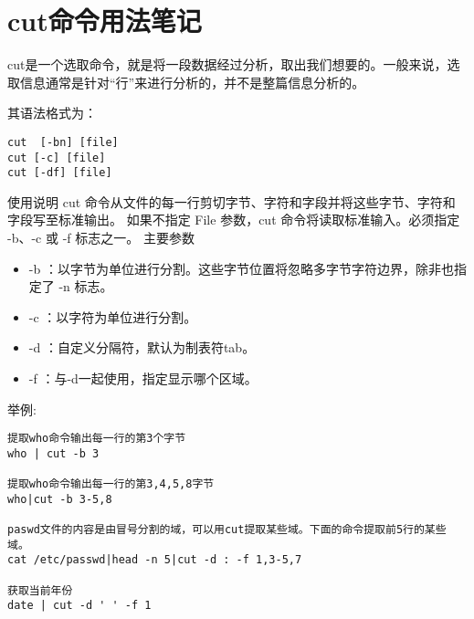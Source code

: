 
\section{cut命令用法笔记}

cut是一个选取命令，就是将一段数据经过分析，取出我们想要的。一般来说，选取信息通常是针对“行”来进行分析的，并不是整篇信息分析的。

其语法格式为：
\begin{verbatim}
cut  [-bn] [file] 
cut [-c] [file]  
cut [-df] [file]
\end{verbatim}

使用说明
cut 命令从文件的每一行剪切字节、字符和字段并将这些字节、字符和字段写至标准输出。
如果不指定 File 参数，cut 命令将读取标准输入。必须指定 -b、-c 或 -f 标志之一。
主要参数

\begin{itemize}
    \item -b ：以字节为单位进行分割。这些字节位置将忽略多字节字符边界，除非也指定了 -n 标志。
    \item -c ：以字符为单位进行分割。
    \item -d ：自定义分隔符，默认为制表符tab。
    \item -f  ：与-d一起使用，指定显示哪个区域。
\end{itemize}

举例:
\begin{verbatim}
提取who命令输出每一行的第3个字节
who | cut -b 3

提取who命令输出每一行的第3,4,5,8字节
who|cut -b 3-5,8

paswd文件的内容是由冒号分割的域，可以用cut提取某些域。下面的命令提取前5行的某些域。
cat /etc/passwd|head -n 5|cut -d : -f 1,3-5,7

获取当前年份
date | cut -d ' ' -f 1

\end{verbatim}
